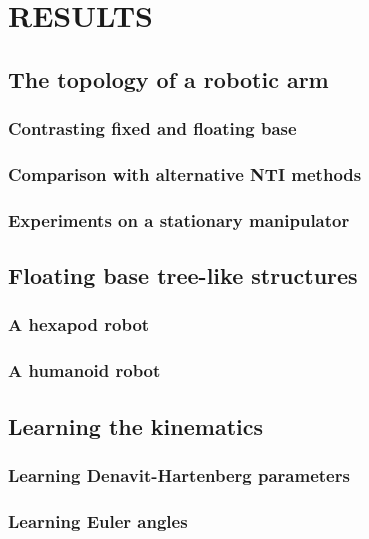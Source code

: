 \documentclass{article}
\begin{document}
\section{RESULTS}
\subsection{The topology of a robotic arm}
\subsubsection{Contrasting fixed and floating base}
\subsubsection{Comparison with alternative NTI methods}
\subsubsection{Experiments on a stationary manipulator}
\subsection{Floating base tree-like structures}
\subsubsection{A hexapod robot}
\subsubsection{A humanoid robot}
\subsection{Learning the kinematics}
\subsubsection{Learning Denavit-Hartenberg parameters}
\subsubsection{Learning Euler angles}
\end{document}
